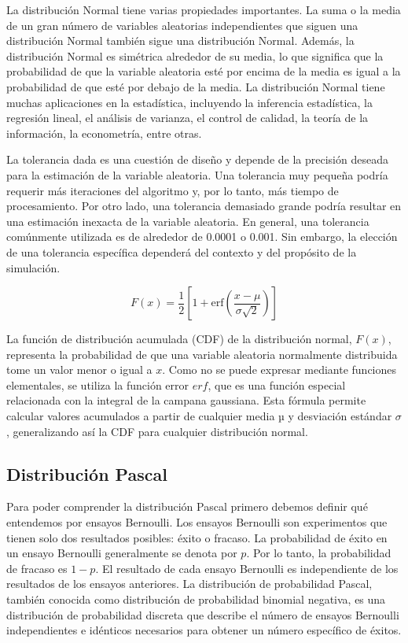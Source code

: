 \documentclass{article}
\begin{document}
 La distribución Normal tiene varias propiedades importantes. La suma o la media de un gran número de variables aleatorias independientes que siguen una distribución Normal también sigue una distribución Normal. Además, la distribución Normal es simétrica alrededor de su media, lo que significa que la probabilidad de que la variable aleatoria esté por encima de la media es igual a la probabilidad de que esté por debajo de la media. La distribución Normal tiene muchas aplicaciones en la estadística, incluyendo la inferencia estadística, la regresión lineal, el análisis de varianza, el control de calidad, la teoría de la información, la econometría, entre otras.

 La tolerancia dada es una cuestión de diseño y depende de la precisión deseada para la estimación de la variable aleatoria. Una tolerancia muy pequeña podría requerir más iteraciones del algoritmo y, por lo tanto, más tiempo de procesamiento. Por otro lado, una tolerancia demasiado grande podría resultar en una estimación inexacta de la variable aleatoria. En general, una tolerancia comúnmente utilizada es de alrededor de 0.0001 o 0.001. Sin embargo, la elección de una tolerancia específica dependerá del contexto y del propósito de la simulación.
 
\begin{equation}
    F(x) = \frac{1}{2} \left[ 1 + \mathrm{erf} \left( \frac{x - \mu}{\sigma \sqrt{2}} \right) \right]
\end{equation}


La función de distribución acumulada (CDF) de la distribución normal, $F(x)$, representa la probabilidad de que una variable aleatoria normalmente distribuida tome un valor menor o igual a $x$. Como no se puede expresar mediante funciones elementales, se utiliza la función error $erf$, que es una función especial relacionada con la integral de la campana gaussiana. Esta fórmula permite calcular valores acumulados a partir de cualquier media $µ$ y desviación estándar $\sigma$, generalizando así la CDF para cualquier distribución normal.

\subsection{Distribución Pascal}
 Para poder comprender la distribución Pascal primero debemos definir qué entendemos por ensayos Bernoulli. Los ensayos Bernoulli son experimentos que tienen solo dos resultados posibles: éxito o fracaso. La probabilidad de éxito en un ensayo Bernoulli generalmente se denota por $p$. Por lo tanto, la probabilidad de fracaso es $1 - p$. El resultado de cada ensayo Bernoulli es independiente de los resultados de los ensayos anteriores.
 La distribución de probabilidad Pascal, también conocida como distribución de probabilidad binomial negativa, es una distribución de probabilidad discreta que describe el número de ensayos Bernoulli independientes e idénticos necesarios para obtener un número específico de éxitos.
 
\end{document}
